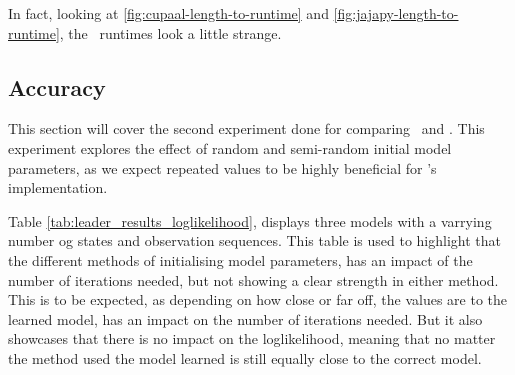 In fact, looking at \autoref{fig:cupaal-length-to-runtime} and \autoref{fig:jajapy-length-to-runtime}, the \Cupaal\ runtimes look a little strange.


\subsection{Accuracy}\label{subsec:accuracy}
This section will cover the second experiment done for comparing \Cupaal\ and \Jajapy.
This experiment explores the effect of random and semi-random initial model parameters, as we expect repeated values to be highly beneficial for \Cupaal's implementation.

Table \autoref{tab:leader_results_loglikelihood}, displays three models with a varrying number og states and observation sequences.
This table is used to highlight that the different methods of initialising model parameters, has an impact of the number of iterations needed, but not showing a clear strength in either method.
This is to be expected, as depending on how close or far off, the values are to the learned model, has an impact on the number of iterations needed.
But it also showcases that there is no impact on the loglikelihood, meaning that no matter the method used the model learned is still equally close to the correct model.



